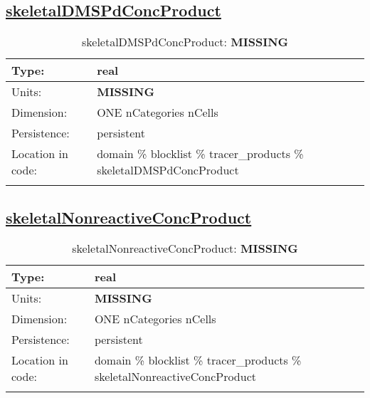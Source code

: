 \subsection[skeletalDMSPdConcProduct]{\hyperref[sec:var_tab_tracer_products]{skeletalDMSPdConcProduct}}
\label{subsec:var_sec_tracer_products_skeletalDMSPdConcProduct}
\begin{center}
\begin{longtable}{| p{2.0in} | p{4.0in} |}
        \hline 
        Type: & real \\
        \hline 
        Units: & {\bf \color{red} MISSING} \\
        \hline 
        Dimension: & ONE nCategories nCells \\
        \hline 
        Persistence: & persistent \\
        \hline 
         Location in code: & domain \% blocklist \% tracer\_products \% skeletalDMSPdConcProduct \\
         \hline 
    \caption{skeletalDMSPdConcProduct: {\bf \color{red} MISSING}}
\end{longtable}
\end{center}
\subsection[skeletalNonreactiveConcProduct]{\hyperref[sec:var_tab_tracer_products]{skeletalNonreactiveConcProduct}}
\label{subsec:var_sec_tracer_products_skeletalNonreactiveConcProduct}
\begin{center}
\begin{longtable}{| p{2.0in} | p{4.0in} |}
        \hline 
        Type: & real \\
        \hline 
        Units: & {\bf \color{red} MISSING} \\
        \hline 
        Dimension: & ONE nCategories nCells \\
        \hline 
        Persistence: & persistent \\
        \hline 
         Location in code: & domain \% blocklist \% tracer\_products \% skeletalNonreactiveConcProduct \\
         \hline 
    \caption{skeletalNonreactiveConcProduct: {\bf \color{red} MISSING}}
\end{longtable}
\end{center}
